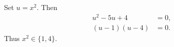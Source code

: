 \documentclass{article}
\begin{document}
\begin{solution}
Set $u=x^2$. Then
\begin{align*}
u^2-5u+4&=0,\\
(u-1)(u-4)&=0.
\end{align*}
Thus $x^2\in\{1,4\}$.
\end{solution}
\end{document}
